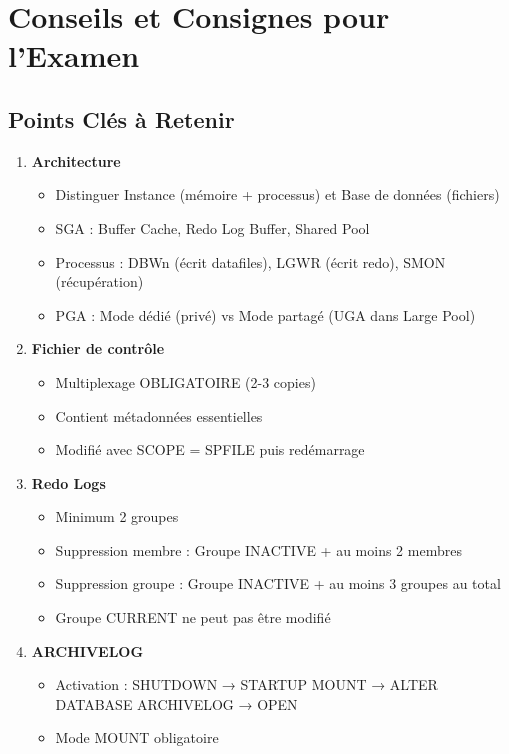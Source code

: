 \documentclass[11pt,a4paper]{article}
\begin{document}
\section{Conseils et Consignes pour l'Examen}

\subsection{Points Clés à Retenir}

\begin{enumerate}
    \item \textbf{Architecture}
    \begin{itemize}
        \item Distinguer Instance (mémoire + processus) et Base de données (fichiers)
        \item SGA : Buffer Cache, Redo Log Buffer, Shared Pool
        \item Processus : DBWn (écrit datafiles), LGWR (écrit redo), SMON (récupération)
        \item PGA : Mode dédié (privé) vs Mode partagé (UGA dans Large Pool)
    \end{itemize}
    
    \item \textbf{Fichier de contrôle}
    \begin{itemize}
        \item Multiplexage OBLIGATOIRE (2-3 copies)
        \item Contient métadonnées essentielles
        \item Modifié avec SCOPE = SPFILE puis redémarrage
    \end{itemize}
    
    \item \textbf{Redo Logs}
    \begin{itemize}
        \item Minimum 2 groupes
        \item Suppression membre : Groupe INACTIVE + au moins 2 membres
        \item Suppression groupe : Groupe INACTIVE + au moins 3 groupes au total
        \item Groupe CURRENT ne peut pas être modifié
    \end{itemize}
    
    \item \textbf{ARCHIVELOG}
    \begin{itemize}
        \item Activation : SHUTDOWN → STARTUP MOUNT → ALTER DATABASE ARCHIVELOG → OPEN
        \item Mode MOUNT obligatoire
    \end{itemize}
    

\end{enumerate}
\end{document}
